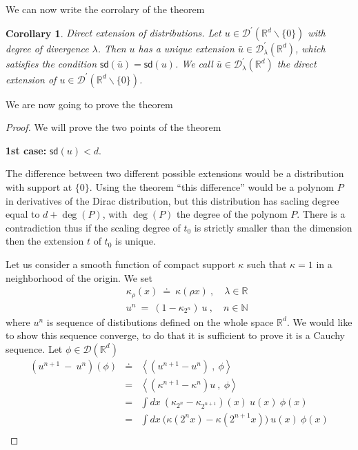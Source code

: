 \documentclass[10pt]{book}
\newcommand{\sd}{\mathsf{sd}}
\newcommand{\sm}[1]{\left\langle#1\right\rangle}
\let\int\int
\newcommand{\Dcal}{\mathcal{D}}
\newcommand{\Nbb}{\mathbb{N}}
\newcommand{\Rbb}{\mathbb{R}}
\theoremstyle{break}
\newtheorem{corollary}{Corollary}
\begin{document}
We can now write the corrolary of the theorem

\begin{corollary} \emph{Direct extension of distributions.} 
 Let $u \in \Dcal^\prime (\Rbb^d \backslash \{0\} )$ with degree of divergence $\lambda$. Then $u$ has a unique extension $\bar{u} \in \Dcal_\lambda^\prime(\Rbb^d)$, which satisfies the condition $\sd(\bar{u}) = \sd(u)$. We call $\bar{u} \in \Dcal_\lambda^\prime(\Rbb^d)$ the direct extension of $u  \in \Dcal^\prime(\Rbb^d \backslash \{0\})$. 
\end{corollary}

We are now going to prove the theorem 

\begin{proof}
 We will prove the two points of the theorem 
 \begin{center}
  \textbf{1st case:} $\sd(u)<d$.
 \end{center}
 The difference between two different possible extensions would be a distribution with support at $\{0\}$. Using the theorem  ``this difference'' would be a polynom $P$ in derivatives of the Dirac distribution, but this distribution has sacling degree equal to $d+\deg(P)$, with $\deg(P)$ the degree of the polynom $P$. There is a contradiction thus if the scaling degree of $t_0$ is strictly smaller than the dimension then the extension $t$ of $t_0$ is unique.\par
 Let us consider a smooth function of compact support $\kappa$ such that $\kappa=1$ in a neighborhood of the origin. We set
 \begin{eqnarray*}
  && \kappa_\rho(x) \ \doteq \ \kappa(\rho x) \ , \quad \lambda \in \Rbb \\
  && u^n \ = \ (1-\kappa_{2^n}) \ u \ , \quad n \in \Nbb
 \end{eqnarray*}
 where $u^n$ is sequence of distibutions defined on the whole space $\Rbb^d$. We would like to show this sequence converge, to do that it is sufficient to prove it is a Cauchy sequence. Let $\phi \in \Dcal(\Rbb^d)$ 
 \begin{eqnarray*}
  \left( u^{n+1} \ - \ u^n \right)(\phi) &\doteq& \sm{\left(u^{n+1} - u^n\right) \ , \ \phi} \\
  &=& \sm{\left(\kappa^{n+1} - \kappa^n\right) u \ , \ \phi} \\
  &=& \int dx \ \left(\kappa_{2^n} - \kappa_{2^{n+1}}\right)(x) \ u(x) \ \phi(x) \\
  &=& \int dx \ \bigg(\kappa(2^n x) - \kappa(2^{n+1} x)\bigg) \ u(x) \ \phi(x) \\

\end{eqnarray*}
\end{proof}
\end{document}
